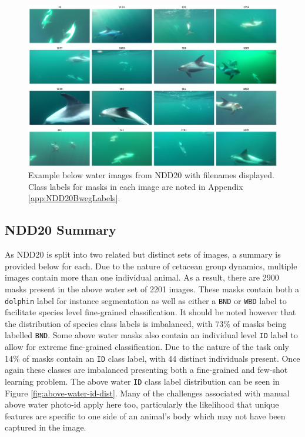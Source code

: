 \begin{figure}
	\begin{center}
		\includegraphics[scale=0.3]{Chapter3/figs/bweg-tiled.png}
	\end{center}
	\caption[Example below water images from NDD20 with filenames displayed.]{Example below water images from NDD20 with filenames displayed. Class labels for masks in each image are noted in Appendix \ref{app:NDD20BwegLabels}.}
	\label{fig:below-water-example}
\end{figure}

\subsection{NDD20 Summary}\label{ch:datasetCreation,sec:NDD20,sub:NDD20Summary}

As NDD20 is split into two related but distinct sets of images, a summary is provided below for each. Due to the nature of cetacean group dynamics, multiple images contain more than one individual animal. As a result, there are 2900 masks present in the above water set of 2201 images. These masks contain both a \texttt{dolphin} label for instance segmentation as well as either a \texttt{BND} or \texttt{WBD} label to facilitate species level fine-grained classification. It should be noted however that the distribution of species class labels is imbalanced, with 73\% of masks being labelled \texttt{BND}. Some above water masks also contain an individual level \texttt{ID} label to allow for extreme fine-grained classification. Due to the nature of the task only 14\% of masks contain an \texttt{ID} class label, with 44 distinct individuals present. Once again these classes are imbalanced presenting both a fine-grained and few-shot learning problem. The above water \texttt{ID} class label distribution can be seen in Figure \ref{fig:above-water-id-dist}. Many of the challenges associated with manual above water photo-id apply here too, particularly the likelihood that unique features are specific to one side of an animal's body which may not have been captured in the image.

